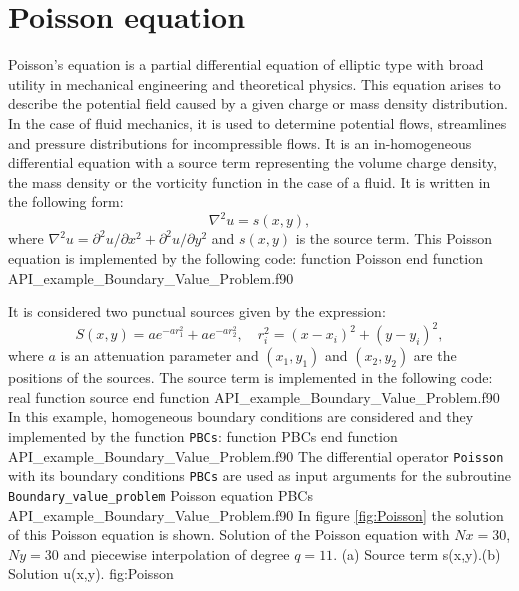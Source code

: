        
\newpage       
\section{Poisson equation}\label{Poisson}  
Poisson's equation is a partial differential equation of elliptic type with broad utility in mechanical engineering and theoretical physics. 
This equation arises to describe the potential field caused by a given charge or mass density distribution. 
In the case of fluid mechanics, it is used  to determine potential flows, streamlines and  pressure distributions for incompressible flows.   
It is an in-homogeneous differential equation with a source term representing the volume charge density, the mass density or the vorticity 
function in the case of a fluid. It is written in the following form:  
\begin{equation*}
             	\nabla^2 u = s(x,y), 
\end{equation*} 
where $\nabla^2 u = \partial^2 u / \partial x^2 + \partial^2 u / \partial y^2 $ and $ s(x,y) $ is the source term.
This Poisson equation is implemented by the following code: 
\vspace{0.8cm} 
         {function Poisson}
         {end function}
         {API_example_Boundary_Value_Problem.f90}
         
 
It is considered two punctual sources given by the expression:
$$
      S(x, y) = a e ^{ -a r^2_1} + a e^{ -a r^2 _2 },  \quad r^2_i = (x-x_i)^ 2 + (y-y_i)^2, 
$$ 
where $ a $ is an attenuation parameter and $ (x_1, y_1) $ and  $ (x_2, y_2) $ are the positions of the sources.   
The source term is implemented in the following code:       
 \vspace{0.8cm} 
           {real function source}
           {end function}
           {API_example_Boundary_Value_Problem.f90}      
In this example, homogeneous boundary conditions are considered and they implemented by the  function \verb|PBCs|:  
 \vspace{0.5cm} 
          {function PBCs}
          {end function}
          {API_example_Boundary_Value_Problem.f90}
The differential operator \verb|Poisson|  with its boundary conditions \verb|PBCs| are used as input arguments for the subroutine 
\verb|Boundary_value_problem|               
\vspace{0.3cm} 
          {Poisson equation}
          {PBCs}
          {API_example_Boundary_Value_Problem.f90}
In figure  \ref{fig:Poisson} the solution of this Poisson equation is shown. 
\vspace{-0.1cm}
   \twographs
       {}
       {}
       {Solution of the Poisson equation with $Nx = 30$, $Ny = 30$ and piecewise interpolation of degree $ q = 11$.
       (a) Source term s(x,y).(b) Solution u(x,y). }
       {fig:Poisson}    
       

